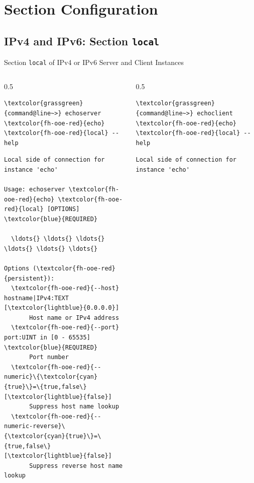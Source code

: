 ﻿\withsectionpage
\section{Section Configuration}
\nosectionpage

\subsection{IPv4 and IPv6: Section \textcolor{fh-ooe-red}{\lstinline|local|}}

\begin{frame}[fragile]{Section \alert{\lstinline|local|} of IPv4 or IPv6 Server and Client Instances}
\begin{columns}[T, onlytextwidth]
\begin{column}{0.5\textwidth}
\begin{scriptsize}
\begin{Verbatim}[commandchars=\\\{\}]
\textcolor{grassgreen}{command@line~>} echoserver \textcolor{fh-ooe-red}{echo} \textcolor{fh-ooe-red}{local} --help
\end{Verbatim}
\begin{Verbatim}[commandchars=\\\{\},frame=leftline,rulecolor=\color{fh-ooe-red}]
Local side of connection for instance 'echo'

Usage: echoserver \textcolor{fh-ooe-red}{echo} \textcolor{fh-ooe-red}{local} [OPTIONS] \textcolor{blue}{REQUIRED}

  \ldots{} \ldots{} \ldots{} \ldots{} \ldots{} \ldots{}

Options (\textcolor{fh-ooe-red}{persistent}):
  \textcolor{fh-ooe-red}{--host} hostname|IPv4:TEXT [\textcolor{lightblue}{0.0.0.0}]
       Host name or IPv4 address
  \textcolor{fh-ooe-red}{--port} port:UINT in [0 - 65535] \textcolor{blue}{REQUIRED}
       Port number
  \textcolor{fh-ooe-red}{--numeric}\{\textcolor{cyan}{true}\}=\{true,false\} [\textcolor{lightblue}{false}]
       Suppress host name lookup
  \textcolor{fh-ooe-red}{--numeric-reverse}\{\textcolor{cyan}{true}\}=\{true,false\} [\textcolor{lightblue}{false}]
       Suppress reverse host name lookup
\end{Verbatim}
\end{scriptsize}
\end{column}
\begin{column}{0.5\textwidth}
\begin{scriptsize}
\begin{Verbatim}[commandchars=\\\{\}]
\textcolor{grassgreen}{command@line~>} echoclient \textcolor{fh-ooe-red}{echo} \textcolor{fh-ooe-red}{local} --help
\end{Verbatim}
\begin{Verbatim}[commandchars=\\\{\},frame=leftline,rulecolor=\color{fh-ooe-red}]
Local side of connection for instance 'echo'


\end{Verbatim}
\end{scriptsize}
\end{column}
\end{columns}
\end{frame}
